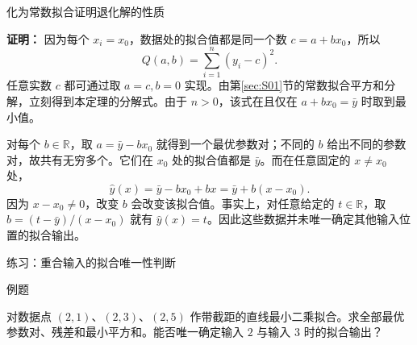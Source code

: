 \documentclass[aspectratio=169,10pt,fontset=fandol]{ctexbeamer}
\begin{document}
\begin{frame}[t,fragile]{化为常数拟合证明退化解的性质}
\footnotesize
{\footnotesize
\textbf{证明：}
因为每个 $x_i=x_0$，数据处的拟合值都是同一个数 $c=a+bx_0$，所以
\[
Q(a,b)=\sum_{i=1}^{n}(y_i-c)^2.
\]
任意实数 $c$ 都可通过取 $a=c,b=0$ 实现。由第\ref{sec:S01}节的常数拟合平方和分解，立刻得到本定理的分解式。由于 $n>0$，该式在且仅在 $a+bx_0=\bar{y}$ 时取到最小值。

对每个 $b\in\mathbb{R}$，取 $a=\bar{y}-bx_0$ 就得到一个最优参数对；不同的 $b$ 给出不同的参数对，故共有无穷多个。它们在 $x_0$ 处的拟合值都是 $\bar{y}$。而在任意固定的 $x\ne x_0$ 处，
\[
\hat{y}(x)=\bar{y}-bx_0+bx=\bar{y}+b(x-x_0).
\]
因为 $x-x_0\ne0$，改变 $b$ 会改变该拟合值。事实上，对任意给定的 $t\in\mathbb{R}$，取 $b=(t-\bar{y})/(x-x_0)$ 就有 $\hat{y}(x)=t$。因此这些数据并未唯一确定其他输入位置的拟合输出。

}
\end{frame}
\begin{frame}[t,fragile]{练习：重合输入的拟合唯一性判断}
\normalsize
\begin{block}{例题}
{\normalsize
对数据点 $(2,1)$、$(2,3)$、$(2,5)$ 作带截距的直线最小二乘拟合。求全部最优参数对、残差和最小平方和。能否唯一确定输入 $2$ 与输入 $3$ 时的拟合输出？

}
\end{block}
\end{frame}
\end{document}
